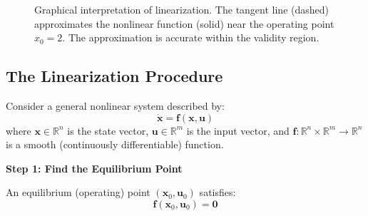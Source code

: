 \begin{figure}[htbp]
\centering
{}
\caption{Graphical interpretation of linearization. The tangent line (dashed) approximates the nonlinear function (solid) near the operating point $x_0 = 2$. The approximation is accurate within the validity region.}
\label{fig:graphical_linearization}
\end{figure}

\subsection{The Linearization Procedure}

Consider a general nonlinear system described by:
\begin{equation}
\dot{\mathbf{x}} = \mathbf{f}(\mathbf{x}, \mathbf{u})
\label{eq:nonlinear_system}
\end{equation}
where $\mathbf{x} \in \mathbb{R}^n$ is the state vector, $\mathbf{u} \in \mathbb{R}^m$ is the input vector, and $\mathbf{f}: \mathbb{R}^n \times \mathbb{R}^m \rightarrow \mathbb{R}^n$ is a smooth (continuously differentiable) function.

\textbf{Step 1: Find the Equilibrium Point}

An equilibrium (operating) point $(\mathbf{x}_0, \mathbf{u}_0)$ satisfies:
\begin{equation}
\mathbf{f}(\mathbf{x}_0, \mathbf{u}_0) = \mathbf{0}
\label{eq:equilibrium}
\end{equation}

